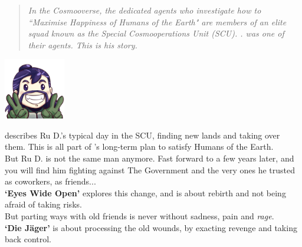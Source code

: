

\begin{abstract}
\noindent
\emph{\normalsize{In the Cosmooverse, the dedicated agents who investigate how to ``Maximise Happiness of Humans of the Earth" are members of an elite squad known as the Special Cosmooperations Unit (SCU). . was one of their agents. This is his story.}}
\end{abstract}

\begin{center}
\includegraphics[width=0.2\textwidth]{Assets/happyD_512}
\end{center}


 describes Ru D.'s typical day in the SCU, finding new lands and taking over them. This is all part of 's long-term plan to satisfy Humans of the Earth.\\

But Ru D. is not the same man anymore. Fast forward to a few years later, and you will find him fighting against The Government and the very ones he trusted as coworkers, as friends...\\

\textbf{`Eyes Wide Open'} explores this change, and is about rebirth and not being afraid of taking risks. \\

But parting ways with old friends is never without sadness, pain and \emph{rage}.\\

\textbf{`Die Jäger'} is about processing the old wounds, by exacting revenge and taking back control.

\clearpage